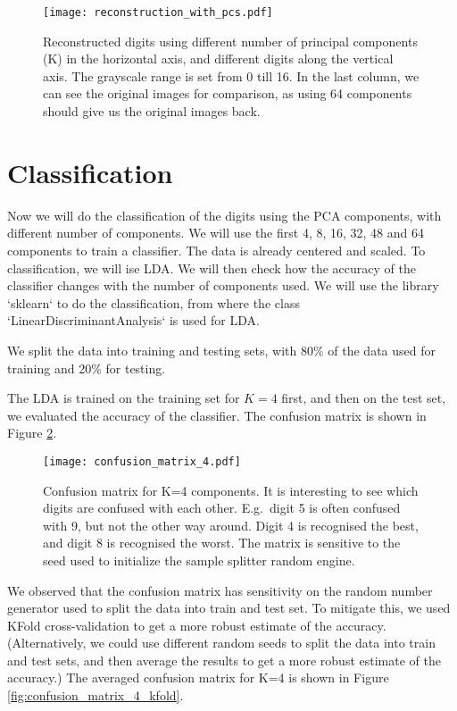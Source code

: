 \documentclass{article}
\begin{document}
\begin{figure}[ht!]
    \centering
    \texttt{[image: reconstruction\_with\_pcs.pdf]}
    \caption{Reconstructed digits using different number of
        principal components (K) in the horizontal axis,
        and different digits along the vertical axis.
        The grayscale range is set from 0 till 16.
        In the last column, we can see the original images for comparison,
        as using 64 components should give us the original images back.}
    \label{fig:reconstruction_with_pcs}
\end{figure}

\section{Classification}
Now we will do the classification of the digits using the PCA components,
with different number of components.
We will use the first 4, 8, 16, 32, 48 and 64 components to train a classifier.
The data is already centered and scaled. To classification, we will ise LDA.
We will then check how the accuracy of the classifier changes with the number of components used.
We will use the library `sklearn` to do the classification,
from where the class `LinearDiscriminantAnalysis` is used for LDA.

We split the data into training and testing sets,
with 80\% of the data used for training and 20\% for testing.

The LDA is trained on the training set for $K=4$ first, and then on the test set,
we evaluated the accuracy of the classifier.
The confusion matrix is shown in Figure \ref{fig:confusion_matrix_4}.

\begin{figure}[ht!]
    \centering
    \texttt{[image: confusion\_matrix\_4.pdf]}
    \caption{Confusion matrix for K=4 components. It is interesting to see
        which digits are confused with each other. E.g.\ digit 5 is often confused with 9,
        but not the other way around.
        Digit 4 is recognised the best, and digit 8 is recognised the worst.
        The matrix is sensitive to the seed used to initialize the sample splitter random engine.}
    \label{fig:confusion_matrix_4}
\end{figure}

We observed that the confusion matrix has sensitivity on the random number generator
used to split the data into train and test set. To mitigate this,
we used KFold cross-validation to get a more robust estimate of the accuracy.
(Alternatively, we could use different random seeds to split the data into train and test sets,
and then average the results to get a more robust estimate of the accuracy.)
The averaged confusion matrix for K=4 is shown in Figure \ref{fig:confusion_matrix_4_kfold}.
\end{document}
